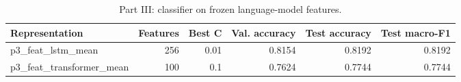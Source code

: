 \begin{table}[t]
\centering
\small
\begin{tabular}{lrrrrr}
\toprule
Representation & Features & Best C & Val. accuracy & Test accuracy & Test macro-F1 \\
\midrule
p3\_feat\_lstm\_mean & 256 & 0.01 & 0.8154 & 0.8192 & 0.8192 \\
p3\_feat\_transformer\_mean & 100 & 0.1 & 0.7624 & 0.7744 & 0.7744 \\
\bottomrule
\end{tabular}
\par\vspace{2pt}{\footnotesize Logistic regression on frozen features; C chosen on validation macro-F1; 5,000 test reviews.}
\caption{Part III: classifier on frozen language-model features.}
\label{tab:part3_table}
\end{table}
